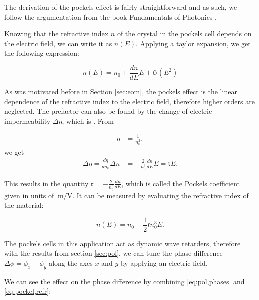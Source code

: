 The derivation of the pockels effect is fairly straightforward and as such, we follow the argumentation from the book Fundamentals of Photonics .

Knowing that the refractive index $n$ of the crystal in the pockels cell depends on the electric field, we can write it as $n(E)$. Applying a taylor expansion, we get the following expression:

\begin{equation}
	n(E) = n_0 + \frac{dn}{dE} E + \mathcal{O}(E^2)
\end{equation}


As was motivated before in Section \ref{sec:eom}, the pockels effect is the linear dependence of the refractive index to the electric field, therefore higher orders are neglected. The prefactor can also be found by the change of electric impermeability $\Delta \eta$, which is . From

\begin{align}
	\eta & = \frac{1}{n_0^2},
\end{align}
we get
\begin{align}
	\Delta \eta = \frac{d \eta}{dn_0} \Delta n & = -\frac{2}{n_0^3} \frac{dn}{dE} E = \mathfrak{r} E .
\end{align}
\label{eq:pockel,refr}

This results in the quantity $\mathfrak{r} = -\frac{2}{n_0^3} \frac{dn}{dE}$, which is called the Pockels coefficient given in units of $\SI{}{\meter\per\volt}$. It can be measured by evaluating the refractive index of the material:

\begin{equation}
	n(E) = n_0 - \frac{1}{2} \mathfrak{r} n_0^3 E .
\end{equation}

The pockels cells in this application act as dynamic wave retarders, therefore with the results from section \ref{sec:pol}, we can tune the phase difference $\Delta \phi = \phi_x - \phi_y$ along the axes $x$ and $y$ by applying an electric field.

We can see the effect on the phase difference by combining \ref{eq:pol,phases} and \ref{eq:pockel,refr}:

